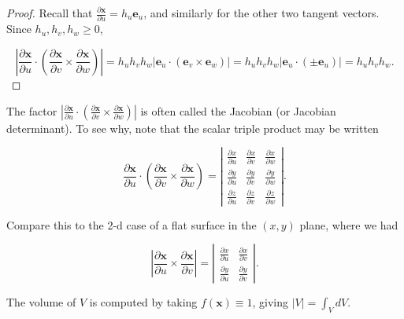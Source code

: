 \begin{proof}
  Recall that \(\frac{\partial \boldsymbol{x}}{\partial u}=h_u \boldsymbol{e}_u\), and similarly for the other two tangent vectors. Since \(h_u, h_v, h_w \geq 0\),

\[
\left|\frac{\partial \boldsymbol{x}}{\partial u} \cdot\left(\frac{\partial \boldsymbol{x}}{\partial v} \times \frac{\partial \boldsymbol{x}}{\partial w}\right)\right|=h_u h_v h_w\left|\boldsymbol{e}_u \cdot\left(\boldsymbol{e}_v \times \boldsymbol{e}_w\right)\right|=h_u h_v h_w\left|\boldsymbol{e}_u \cdot\left( \pm \boldsymbol{e}_u\right)\right|=h_u h_v h_w .
\]
\end{proof}

\begin{remark}
  The factor \(\left|\frac{\partial \boldsymbol{x}}{\partial u} \cdot\left(\frac{\partial \boldsymbol{x}}{\partial v} \times \frac{\partial \boldsymbol{x}}{\partial w}\right)\right|\) is often called the Jacobian (or Jacobian determinant). To see why, note that the scalar triple product may be written

\[
\frac{\partial \boldsymbol{x}}{\partial u} \cdot\left(\frac{\partial \boldsymbol{x}}{\partial v} \times \frac{\partial \boldsymbol{x}}{\partial w}\right)=\left|\begin{array}{lll}
\frac{\partial x}{\partial u} & \frac{\partial x}{\partial v} & \frac{\partial x}{\partial w} \\
\frac{\partial y}{\partial u} & \frac{\partial y}{\partial v} & \frac{\partial y}{\partial w} \\
\frac{\partial z}{\partial u} & \frac{\partial z}{\partial v} & \frac{\partial z}{\partial w}
\end{array}\right| .
\]

Compare this to the 2-d case of a flat surface in the \((x, y)\) plane, where we had

\[
\left|\frac{\partial \boldsymbol{x}}{\partial u} \times \frac{\partial \boldsymbol{x}}{\partial v}\right|=\left|\begin{array}{ll}
\frac{\partial x}{\partial u} & \frac{\partial x}{\partial v} \\
\frac{\partial y}{\partial u} & \frac{\partial y}{\partial v}
\end{array}\right| .
\]
\end{remark}

\begin{method}
The volume of \(V\) is computed by taking \(f(\boldsymbol{x}) \equiv 1\), giving \(|V|=\int_V d V\).  
\end{method}

